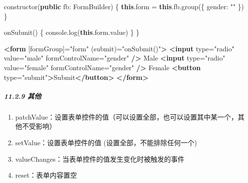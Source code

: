 \documentclass[
]{article}
\newenvironment{Shaded}{}{}
\newcommand{\AttributeTok}[1]{\textcolor[rgb]{0.49,0.56,0.16}{#1}}
\newcommand{\BuiltInTok}[1]{#1}
\newcommand{\DataTypeTok}[1]{\textcolor[rgb]{0.56,0.13,0.00}{#1}}
\newcommand{\FunctionTok}[1]{\textcolor[rgb]{0.02,0.16,0.49}{#1}}
\newcommand{\KeywordTok}[1]{\textcolor[rgb]{0.00,0.44,0.13}{\textbf{#1}}}
\newcommand{\NormalTok}[1]{#1}
\newcommand{\OperatorTok}[1]{\textcolor[rgb]{0.40,0.40,0.40}{#1}}
\newcommand{\OtherTok}[1]{\textcolor[rgb]{0.00,0.44,0.13}{#1}}
\newcommand{\StringTok}[1]{\textcolor[rgb]{0.25,0.44,0.63}{#1}}
\begin{document}
\begin{enumerate}
\begin{Shaded}
\begin{Highlighting}[]
  \FunctionTok{constructor}\NormalTok{(}\KeywordTok{public} \DataTypeTok{fb}\OperatorTok{:}\NormalTok{ FormBuilder) \{}
    \KeywordTok{this}\OperatorTok{.}\AttributeTok{form} \OperatorTok{=} \KeywordTok{this}\OperatorTok{.}\AttributeTok{fb}\OperatorTok{.}\FunctionTok{group}\NormalTok{(\{ }\DataTypeTok{gender}\OperatorTok{:} \StringTok{""}\NormalTok{ \})}
\NormalTok{  \}}

  \FunctionTok{onSubmit}\NormalTok{() \{}
    \BuiltInTok{console}\OperatorTok{.}\FunctionTok{log}\NormalTok{(}\KeywordTok{this}\OperatorTok{.}\AttributeTok{form}\OperatorTok{.}\AttributeTok{value}\NormalTok{)}
\NormalTok{  \}}
\NormalTok{\}}
\end{Highlighting}
\end{Shaded}

\begin{Shaded}
\begin{Highlighting}[]
\KeywordTok{\textless{}form}\OtherTok{ [formGroup]=}\StringTok{"form"}\OtherTok{ (submit)=}\StringTok{"onSubmit()"}\KeywordTok{\textgreater{}}
  \KeywordTok{\textless{}input}\OtherTok{ type=}\StringTok{"radio"}\OtherTok{ value=}\StringTok{"male"}\OtherTok{ formControlName=}\StringTok{"gender"} \KeywordTok{/\textgreater{}}\NormalTok{ Male}
  \KeywordTok{\textless{}input}\OtherTok{ type=}\StringTok{"radio"}\OtherTok{ value=}\StringTok{"female"}\OtherTok{ formControlName=}\StringTok{"gender"} \KeywordTok{/\textgreater{}}\NormalTok{ Female}
  \KeywordTok{\textless{}button}\OtherTok{ type=}\StringTok{"submit"}\KeywordTok{\textgreater{}}\NormalTok{Submit}\KeywordTok{\textless{}/button\textgreater{}}
\KeywordTok{\textless{}/form\textgreater{}}
\end{Highlighting}
\end{Shaded}
\end{enumerate}

\hypertarget{1129-ux5176ux4ed6}{%
\subparagraph{11.2.9 其他}\label{1129-ux5176ux4ed6}}

\begin{enumerate}
\def\labelenumi{\arabic{enumi}.}
\item
  patchValue：设置表单控件的值（可以设置全部，也可以设置其中某一个，其他不受影响）
\item
  setValue：设置表单控件的值 (设置全部，不能排除任何一个)
\item
  valueChanges：当表单控件的值发生变化时被触发的事件
\item
  reset：表单内容置空
\end{enumerate}
\end{document}
